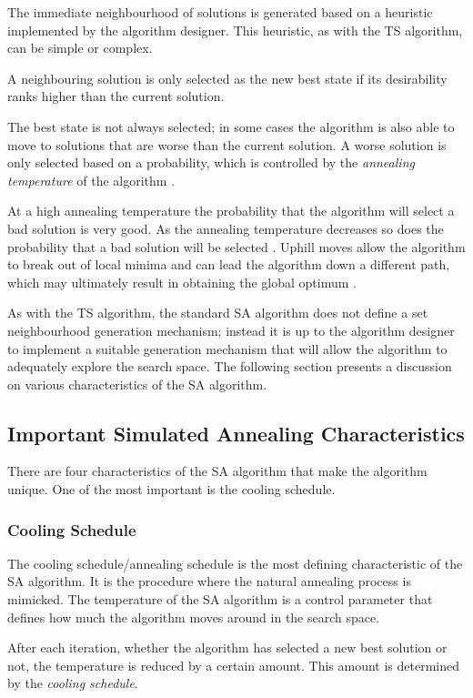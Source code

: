 The immediate neighbourhood of solutions is generated based on a heuristic implemented by the algorithm designer\cite{AIModernApproach}. This heuristic, as with the \gls{TS} algorithm, can be simple or complex.

A neighbouring solution is only selected as the new best state if its desirability ranks higher than the current solution.

The best state is not always selected; in some cases the algorithm is also able to move to solutions that are worse than the current solution. A worse solution is only selected based on a probability, which is controlled by the \emph{annealing temperature} of the algorithm \cite{TheoPraticalSA}. 

At a high annealing temperature the probability that the algorithm will select a bad solution is very good. As the annealing temperature decreases so does the probability that a bad solution will be selected \cite{CurveFittingSA}.  Uphill moves allow the algorithm to break out of local minima and can lead the algorithm down a different path, which may ultimately result in obtaining the global optimum \cite{SASingleMultiObj}. 

As with the \gls{TS} algorithm, the standard \gls{SA} algorithm does not define a set neighbourhood generation mechanism; instead it is up to the algorithm designer to implement a suitable generation mechanism that will allow the algorithm to adequately explore the search space\cite{VariousCoolingSA}. 
The following section presents a discussion on various characteristics of the \gls{SA} algorithm.
\subsection{Important Simulated Annealing Characteristics}
There are four characteristics of the \gls{SA} algorithm that make the algorithm unique. One of the most important is the cooling schedule. 

\subsubsection{Cooling Schedule}
The cooling schedule/annealing schedule is the most defining characteristic of the \gls{SA} algorithm. It is the procedure where the natural annealing process is mimicked. The temperature of the \gls{SA} algorithm is a control parameter that defines how much the algorithm moves around in the search space.

After each iteration, whether the algorithm has selected a new best solution or not, the temperature is reduced by a certain amount. This amount is determined by the \emph{cooling schedule}.


